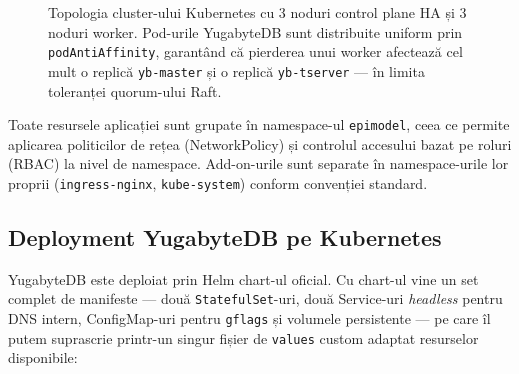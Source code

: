 \begin{figure}[t]
{
}
\caption[Topologia clusterului Kubernetes]{Topologia cluster-ului Kubernetes cu 3 noduri control plane
HA și 3 noduri worker. Pod-urile YugabyteDB sunt distribuite uniform
prin \texttt{podAntiAffinity}, garantând că pierderea unui worker
afectează cel mult o replică \texttt{yb-master} și o replică
\texttt{yb-tserver} --- în limita toleranței quorum-ului Raft.}
\label{fig:k8s_topology}
\end{figure}

Toate resursele aplicației sunt grupate în namespace-ul
\texttt{epimodel}, ceea ce permite aplicarea politicilor de rețea
(NetworkPolicy) și controlul accesului bazat pe roluri (RBAC) la nivel
de namespace. Add-on-urile sunt separate în namespace-urile lor proprii
(\texttt{ingress-nginx}, \texttt{kube-system}) conform convenției
standard.

\subsection{Deployment YugabyteDB pe Kubernetes}
\label{subsec:deploy_yugabyte}

YugabyteDB este deploiat prin Helm chart-ul oficial. Cu chart-ul vine un
set complet de manifeste --- două \texttt{StatefulSet}-uri, două Service-uri
\emph{headless} pentru DNS intern, ConfigMap-uri pentru \texttt{gflags} și
volumele persistente --- pe care îl putem suprascrie printr-un singur fișier
de \texttt{values} custom adaptat resurselor disponibile:

